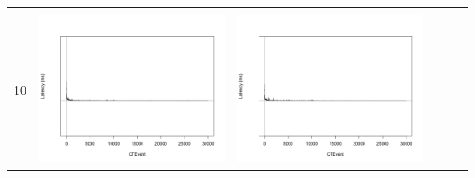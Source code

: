 \begin{table}[htbp]
{\begin{tabular}{l | ccccc}
\begin{minipage}{.15\textwidth}
    				 \end{minipage}\\			
		10	   & \begin{minipage}{.15\textwidth}\vspace{2pt}     							
     			 	\includegraphics[width=\linewidth]{images/lat-log-triple/I2}
    				\end{minipage}
    			   & \begin{minipage}{.15\textwidth}\vspace{2pt}     							
     			 	\includegraphics[width=\linewidth]{images/lat-log-triple/I6}
    				 \end{minipage}\\		

\end{tabular}}
\end{table}
